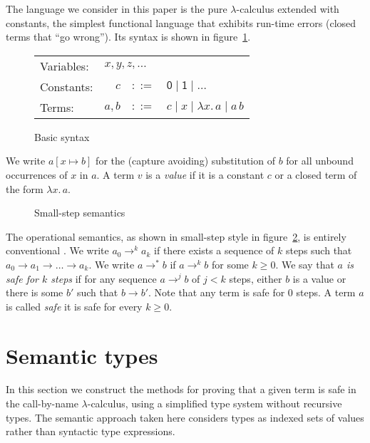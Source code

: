 \documentclass[10pt,a4paper,final,twocolumn]{article}
\theoremstyle{definition}
\theoremstyle{plain}
\newcommand{\abstr}[2]{\ensuremath{\lambda{#1}.\,{#2}}}
\newcommand{\app}[2]{\ensuremath{{#1}\,{#2}}}
\begin{document}
The language we consider in this paper is the pure $\lambda$-calculus extended with constants,
the simplest functional language that exhibits run-time errors (closed terms that ``go wrong'').
Its syntax is shown in figure~\ref{fig:Basic_syntax}.
\begin{figure}[htb]
  \centering
  \begin{tabular}{lrcl}
    Variables: & \multicolumn{3}{l}{$x,y,z,\ldots$} \\
    Constants: & $c$ & $::=$ & $\mathsf{0} \mid \mathsf{1} \mid \ldots$ \\
    Terms: & $a,b$ & $::=$ & $c \mid x \mid \abstr{x}{a} \mid \app{a}{b}$
  \end{tabular}
  \caption{Basic syntax}
  \label{fig:Basic_syntax}
\end{figure}
We write $a[x \mapsto b]$ for the (capture avoiding) substitution of $b$ for all unbound occurrences
of $x$ in $a$. A term $v$ is a \emph{value} if it is a constant $c$ or a closed term of the form
$\abstr{x}{a}$.
\begin{figure}[htb]
  \centering
  \caption{Small-step semantics}
  \label{fig:Small_step_semantics}
\end{figure}

The operational semantics, as shown in small-step style in figure~\ref{fig:Small_step_semantics},
is entirely conventional \cite{Pierce02}. We write \mbox{$a_0 \to^k a_k$} if there exists a sequence of $k$ 
steps such that \mbox{$a_0 \to a_1 \to \ldots \to a_k$}. We write \mbox{$a \to^* b$} if \mbox{$a \to^k b$}
for some \mbox{$k \ge 0$}. We say that \emph{$a$ is safe for $k$ steps} if for any sequence \mbox{$a \to^j b$}
of \mbox{$j < k$} steps, either $b$ is a value or there is some $b'$ such that \mbox{$b \to b'$}. Note that
any term is safe for $0$ steps. A term $a$ is called \emph{safe} it is safe for every \mbox{$k \ge 0$}.


\section{Semantic types}
\label{sec:Semantic_types}


In this section we construct the methods for proving that a given term is safe in the call-by-name
$\lambda$-calculus, using a simplified type system without recursive types. The semantic approach
taken here considers types as indexed sets of values rather than syntactic type expressions.
\end{document}
